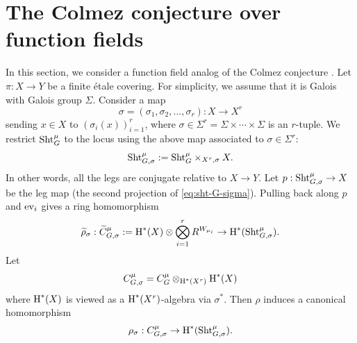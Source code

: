 \documentclass[reqno]{amsart}
\numberwithin{equation}{subsection}
\theoremstyle{definition}
\newcommand\ev{\textup{ev}}
\newcommand\Sht{\textup{Sht}}
\newcommand{\wt}[1]{\widetilde{#1}}
\newcommand\ot{\otimes}
\newcommand{\cohog}[2]{\textup{H}^{#1}({#2})}     %
\renewcommand\r\rho
\newcommand{\s}{\sigma}
\newcommand{\Sig}{\Sigma}
\begin{document}
\section{The Colmez conjecture over function fields} \label{s:Col}

In this section, we consider a function field analog of the Colmez conjecture \cite{Col1}.
Let $\pi: X\to Y$ be a finite \'etale covering. For simplicity, we assume that it is Galois with Galois group $\Sig$.
Consider a map 
\begin{equation*}
  \s= (\s_1,\s_2,\ldots,\s_r): X \to X^r
\end{equation*}
sending $x\in X$ to $(\s_i(x))_{i=1}^r$, where $\s\in\Sig^r= \Sig\times\cdots\times \Sig$ is an $r$-tuple. 
We restrict $\Sht^\mu_G$ to the locus using the above map associated to $\s\in\Sig^r$:
\begin{equation}\label{eq:sht-G-sigma}
    \Sht^\mu_{G,\s}:=\Sht^\mu_G\times_{X^r,\s}X.
\end{equation} In other words, all the legs are conjugate relative to $X\to Y$. Let $p: \Sht^\mu_{G,\s}\to X$ be the leg map (the second projection of \eqref{eq:sht-G-sigma}). Pulling back along $p$ and $\ev_i$ gives a ring homomorphism
\begin{equation}\label{taut hom mix}
    \wt\rho_{\s}:\wt C^\mu_{G,\s}:=\cohog{*}{X} \ot \bigotimes_{i=1}^r R^{W_{\mu_i}}\to \cohog{*}{\Sht^\mu_{G, \s}}.
\end{equation}
Let
\begin{equation*}
    C^\mu_{G,\s}=C^\mu_G\ot_{\cohog{*}{X^r}}\cohog{*}{X}
\end{equation*}
where $\cohog{*}{X}$ is viewed as a $\cohog{*}{X^r}$-algebra via $\s^*$. 
Then $\r$ induces a canonical homomorphism
\begin{equation*}
    \r_\s: C^\mu_{G,\s}\to \cohog{*}{\Sht^\mu_{G,\s}}.
\end{equation*}

\end{document}
